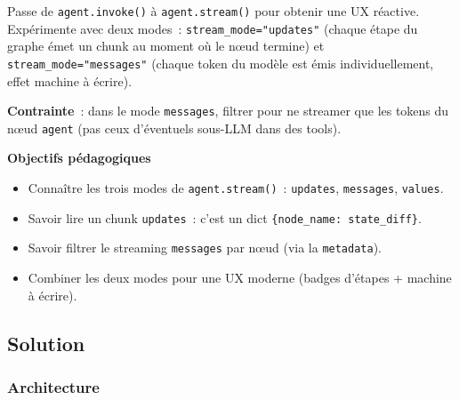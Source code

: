 \documentclass[11pt,a4paper]{article}
\begin{document}
\begin{tcolorbox}[title=Exercice bonus 5. Streamer un agent en deux modes complémentaires]
Passe de \texttt{agent.invoke()} à \texttt{agent.stream()} pour obtenir
une UX réactive. Expérimente avec deux modes~:
\texttt{stream\_mode="updates"} (chaque étape du graphe émet un chunk au
moment où le nœud termine) et \texttt{stream\_mode="messages"} (chaque
token du modèle est émis individuellement, effet machine à écrire).

\textbf{Contrainte}~: dans le mode \texttt{messages}, filtrer pour ne
streamer que les tokens du nœud \texttt{agent} (pas ceux d'éventuels
sous-LLM dans des tools).

\bigskip
\noindent\textbf{Objectifs pédagogiques}
\begin{itemize}[leftmargin=*]
  \item Connaître les trois modes de \texttt{agent.stream()}~:
        \texttt{updates}, \texttt{messages}, \texttt{values}.
  \item Savoir lire un chunk \texttt{updates}~: c'est un dict
        \texttt{\{node\_name: state\_diff\}}.
  \item Savoir filtrer le streaming \texttt{messages} par nœud (via la
        \texttt{metadata}).
  \item Combiner les deux modes pour une UX moderne (badges d'étapes +
        machine à écrire).
\end{itemize}
\end{tcolorbox}

\subsection{Solution}

\subsubsection{Architecture}

\begin{center}
\end{center}
\end{document}
